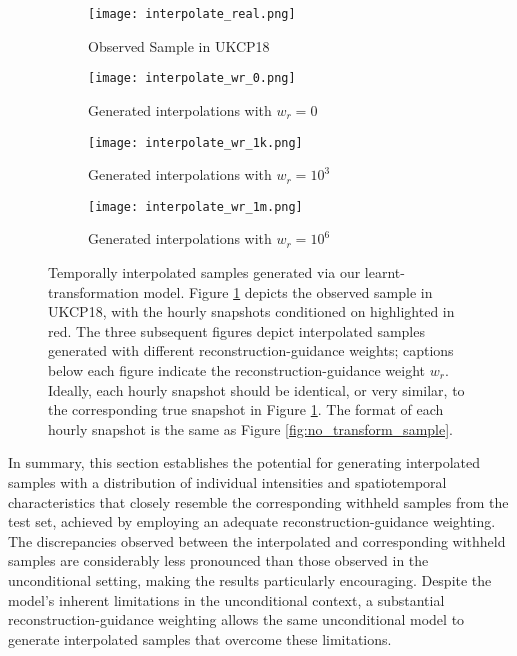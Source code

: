 \documentclass[ oneside,%
                    author={George Herbert},
                    degree={MSci},
                     title={Diffusion Models for Time-Evolving Precipitation Fields},
                  subtitle={}]{dissertation}
\begin{document}
\begin{figure}[htbp]
      \centering
      \begin{subfigure}{\textwidth}
            \texttt{[image: interpolate\_real.png]}
            \caption{Observed Sample in UKCP18}
            \label{fig:interpolate_sample_real}
      \end{subfigure}
      \begin{subfigure}{\textwidth}
            \texttt{[image: interpolate\_wr\_0.png]}
            \caption{Generated interpolations with $w_r=0$}
            \label{fig:interpolate_sample_wr_0}
      \end{subfigure}
      \begin{subfigure}{\textwidth}
            \texttt{[image: interpolate\_wr\_1k.png]}
            \caption{Generated interpolations with $w_r=10^3$}
            \label{fig:interpolate_sample_wr_1k}
      \end{subfigure}
      \begin{subfigure}{\textwidth}
            \texttt{[image: interpolate\_wr\_1m.png]}
            \caption{Generated interpolations with $w_r=10^6$}
            \label{fig:interpolate_sample_wr_1m}
      \end{subfigure}
      \caption{Temporally interpolated samples generated via our learnt-transformation model. Figure \ref{fig:interpolate_sample_real} depicts the observed sample in UKCP18, with the hourly snapshots conditioned on highlighted in red. The three subsequent figures depict interpolated samples generated with different reconstruction-guidance weights; captions below each figure indicate the reconstruction-guidance weight $w_r$. Ideally, each hourly snapshot should be identical, or very similar, to the corresponding true snapshot in Figure \ref{fig:interpolate_sample_real}. The format of each hourly snapshot is the same as Figure \ref{fig:no_transform_sample}.}
      \label{fig:interpolate_sample}
\end{figure}

In summary, this section establishes the potential for generating interpolated samples with a distribution of individual intensities and spatiotemporal characteristics that closely resemble the corresponding withheld samples from the test set, achieved by employing an adequate reconstruction-guidance weighting. The discrepancies observed between the interpolated and corresponding withheld samples are considerably less pronounced than those observed in the unconditional setting, making the results particularly encouraging. Despite the model's inherent limitations in the unconditional context, a substantial reconstruction-guidance weighting allows the same unconditional model to generate interpolated samples that overcome these limitations.
\end{document}
